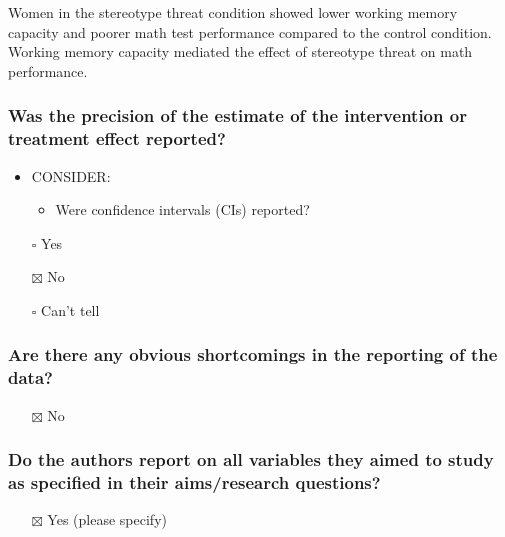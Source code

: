 \documentclass[
  doc, a4paper]{apa7}
\providecommand{\tightlist}{%
  \setlength{\itemsep}{0pt}\setlength{\parskip}{0pt}}
\begin{document}
Women in the stereotype threat condition showed lower working memory capacity and poorer math test performance compared to the control condition. Working memory capacity mediated the effect of stereotype threat on math performance.

\subsubsection{Was the precision of the estimate of the intervention or treatment effect reported?}\label{was-the-precision-of-the-estimate-of-the-intervention-or-treatment-effect-reported}

\begin{itemize}
\tightlist
\item
  CONSIDER:

  \begin{itemize}
  \tightlist
  \item
    Were confidence intervals (CIs) reported?
  \end{itemize}
\item[$\square$]
  Yes
\item[$\boxtimes$]
  No
\item[$\square$]
  Can't tell
\end{itemize}

\subsubsection{Are there any obvious shortcomings in the reporting of the data?}\label{are-there-any-obvious-shortcomings-in-the-reporting-of-the-data}

\begin{itemize}
\tightlist
\item[$\boxtimes$]
  No
\end{itemize}

\subsubsection{Do the authors report on all variables they aimed to study as specified in their aims/research questions?}\label{do-the-authors-report-on-all-variables-they-aimed-to-study-as-specified-in-their-aimsresearch-questions}

\begin{itemize}
\tightlist
\item[$\boxtimes$]
  Yes (please specify)
\end{itemize}
\end{document}
